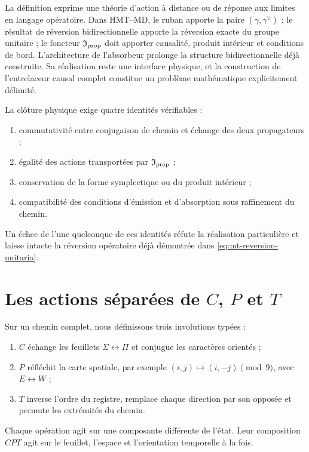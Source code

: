 La définition exprime une théorie d'action à distance ou de réponse aux
limites en langage opératoire. Dans HMT--MD, le ruban apporte la paire
$(\gamma,\gamma^\vee)$ ; le résultat de réversion bidirectionnelle apporte
la réversion exacte du groupe unitaire ; le foncteur
$\mathfrak I_{\rm prop}$ doit apporter causalité, produit intérieur et
conditions de bord. L'architecture de l'absorbeur prolonge la structure
bidirectionnelle déjà construite. Sa réalisation reste une interface physique,
et la construction de l'entrelaceur causal complet constitue un problème
mathématique explicitement délimité.

La clôture physique exige quatre identités vérifiables :
\begin{enumerate}
 \item commutativité entre conjugaison de chemin et échange des deux
 propagateurs ;
 \item égalité des actions transportées par
 $\mathfrak I_{\rm prop}$ ;
 \item conservation de la forme symplectique ou du produit intérieur ;
 \item compatibilité des conditions d'émission et d'absorption sous
 raffinement du chemin.
\end{enumerate}
Un échec de l'une quelconque de ces identités réfute la réalisation particulière
et laisse intacte la réversion opératoire déjà démontrée dans
\eqref{eq:mt-reversion-unitaria}.

\section{Les actions séparées de \texorpdfstring{$C$}{C},
\texorpdfstring{$P$}{P} et \texorpdfstring{$T$}{T}}

Sur un chemin complet, nous définissons trois involutions typées :
\begin{enumerate}
 \item $C$ échange les feuillets $\Sigma\leftrightarrow\Pi$ et conjugue les
 caractères orientés ;
 \item $P$ réfléchit la carte spatiale, par exemple
 $(i,j)\mapsto(i,-j)\pmod9$, avec
 $E\leftrightarrow W$ ;
 \item $T$ inverse l'ordre du registre, remplace chaque direction par son
 opposée et permute les extrémités du chemin.
\end{enumerate}
Chaque opération agit sur une composante différente de l'état. Leur composition
$CPT$ agit sur le feuillet, l'espace et l'orientation temporelle à la fois.

